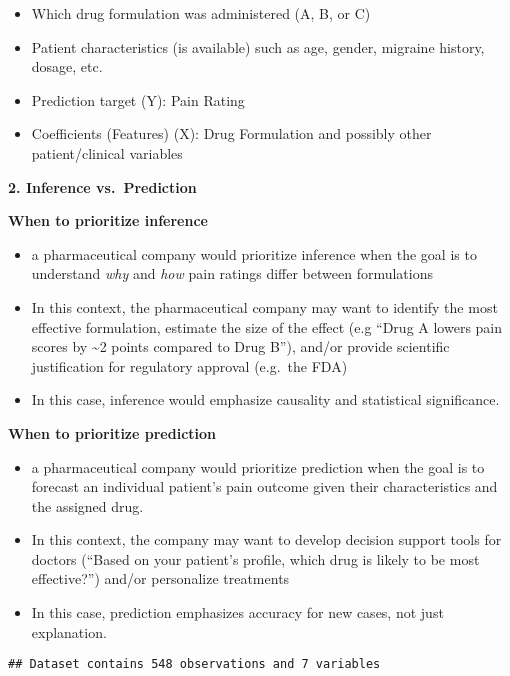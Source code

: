 \documentclass[
]{article}
\providecommand{\tightlist}{%
  \setlength{\itemsep}{0pt}\setlength{\parskip}{0pt}}
\begin{document}
\begin{itemize}
\tightlist
\item
  Which drug formulation was administered (A, B, or C)
\item
  Patient characteristics (is available) such as age, gender, migraine
  history, dosage, etc.
\item
  Prediction target (Y): Pain Rating
\item
  Coefficients (Features) (X): Drug Formulation and possibly other
  patient/clinical variables
\end{itemize}

\textbf{2. Inference vs.~Prediction}

\textbf{When to prioritize inference}

\begin{itemize}
\tightlist
\item
  a pharmaceutical company would prioritize inference when the goal is
  to understand \emph{why} and \emph{how} pain ratings differ between
  formulations
\item
  In this context, the pharmaceutical company may want to identify the
  most effective formulation, estimate the size of the effect (e.g
  ``Drug A lowers pain scores by \textasciitilde2 points compared to
  Drug B''), and/or provide scientific justification for regulatory
  approval (e.g.~the FDA)
\item
  In this case, inference would emphasize causality and statistical
  significance.
\end{itemize}

\textbf{When to prioritize prediction}

\begin{itemize}
\tightlist
\item
  a pharmaceutical company would prioritize prediction when the goal is
  to forecast an individual patient's pain outcome given their
  characteristics and the assigned drug.
\item
  In this context, the company may want to develop decision support
  tools for doctors (``Based on your patient's profile, which drug is
  likely to be most effective?'') and/or personalize treatments
\item
  In this case, prediction emphasizes accuracy for new cases, not just
  explanation.
\end{itemize}

\begin{verbatim}
## Dataset contains 548 observations and 7 variables
\end{verbatim}
\end{document}

